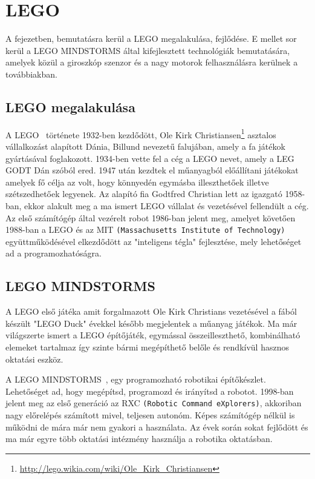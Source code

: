 \chapter{LEGO} \label{ch:ROBOT}

\begin{osszefoglal}
A fejezetben, bemutatásra kerül a LEGO megalakulása, fejlődése. E mellet sor kerül a LEGO MINDSTORMS által kifejlesztett technológiák bemutatására, amelyek közül a giroszkóp szenzor és a nagy motorok felhasználásra kerülnek a továbbiakban.
\end{osszefoglal}

\section{LEGO megalakulása}\label{sec:ROBOT:lego}
A LEGO~\cite{lego}\cite{legoHistory} története 1932-ben kezdődött, Ole Kirk Christiansen\footnote{\href {http://lego.wikia.com/wiki/Ole\_Kirk\_Christiansen}{http://lego.wikia.com/wiki/Ole\_Kirk\_Christiansen}} asztalos vállalkozást alapított Dánia, Billund nevezetű falujában, amely a fa játékok gyártásával foglakozott. 1934-ben vette fel a cég a LEGO nevet, amely a LEG GODT Dán szóból ered. 1947 után kezdtek el műanyagból előállítani játékokat amelyek fő célja az volt, hogy könnyedén egymásba illeszthetőek illetve szétszedhetőek legyenek. Az alapító fia Godtfred Christian lett az igazgató 1958-ban, ekkor alakult meg a ma ismert LEGO vállalat és vezetésével fellendült a cég. Az első számítógép által vezérelt robot 1986-ban jelent meg, amelyet követően 1988-ban a LEGO és az MIT \texttt{(Massachusetts Institute of Technology)} együttműködésével elkezdődött az "inteligens tégla" fejlesztése, mely lehetőséget ad a programozhatóságra.

\section{LEGO MINDSTORMS}\label{sec:ROBOT:mindstorms}
A LEGO  első játéka amit forgalmazott Ole Kirk Christians vezetésével a fából készült "LEGO Duck" évekkel később megjelentek a műanyag játékok. Ma már világszerte ismert a LEGO építőjáték, egymással összeilleszthető, kombinálható elemeket tartalmaz így szinte bármi megépíthető belőle és rendkívül hasznos oktatási eszköz. 

A LEGO MINDSTORMS~\cite{mindstormsHistory}, egy programozható robotikai építőkészlet. Lehetőséget ad, hogy megépítsd, programozd és irányítsd a robotot.
1998-ban jelent meg az első generáció az RXC \texttt{(Robotic Command eXplorers)}, akkoriban nagy előrelépés számított mivel, teljesen autonóm. Képes számítógép nélkül is működni de mára már nem gyakori a használata. Az évek során sokat fejlődött és ma már egyre több oktatási intézmény használja a robotika oktatásban.

